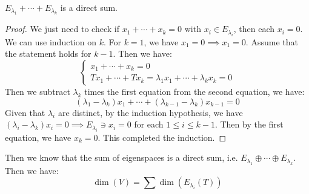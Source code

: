 \begin{proposition}
  $E_{\lambda_1} + \cdots + E_{\lambda_k}$ is a direct sum.
\end{proposition}
\begin{proof}
  We just need to check if $x_1 + \cdots + x_k = 0$ with $x_i \in E_{\lambda_i}$, then each $x_i = 0$. We can use induction on $k$. For $k = 1$, we have $x_1 = 0 \implies x_1 = 0$. Assume that the statement holds for $k - 1$. Then we have:
  \[
    \begin{cases}
      x_1 + \cdots + x_k = 0 \\
      Tx_1 + \cdots + Tx_k = \lambda_1 x_1 + \cdots + \lambda_k x_k = 0
    \end{cases}
  \]
  Then we subtract $\lambda_k$ times the first equation from the second equation, we have:
  \[
    (\lambda_1 - \lambda_k) x_1 + \cdots + (\lambda_{k - 1} - \lambda_k) x_{k - 1} = 0
  \]
  Given that $\lambda_i$ are distinct, by the induction hypothesis, we have $(\lambda_i - \lambda_k) x_i = 0 \implies E_{\lambda_i} \ni x_i = 0$ for each $1 \leq i \leq k - 1$. Then by the first equation, we have $x_k = 0$. This completed the induction.
\end{proof}

Then we know that the sum of eigenspaces is a direct sum, i.e. $E_{\lambda_1} \oplus \cdots \oplus E_{\lambda_k}$. Then we have:
\[
  \dim(V) = \sum \dim(E_{\lambda_i} (T))
\]

